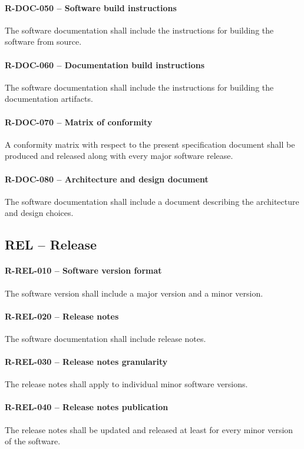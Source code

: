 \paragraph{R-DOC-050 -- Software build instructions}
The software documentation shall include the instructions for building
the software from source.

\paragraph{R-DOC-060 -- Documentation build instructions}
The software documentation shall include the instructions for building
the documentation artifacts.

\paragraph{R-DOC-070 -- Matrix of conformity}
A conformity matrix with respect to the present specification document shall
be produced and released along with every major software release.

\paragraph{R-DOC-080 -- Architecture and design document}
The software documentation shall include a document describing the architecture
and design choices.

\subsection{REL -- Release}
\paragraph{R-REL-010 -- Software version format}
The software version shall include a major version and a minor version.

\paragraph{R-REL-020 -- Release notes}
The software documentation shall include release notes.

\paragraph{R-REL-030 -- Release notes granularity}
The release notes shall apply to individual minor software versions.

\paragraph{R-REL-040 -- Release notes publication}
The release notes shall be updated and released at least for every minor
version of the software.

